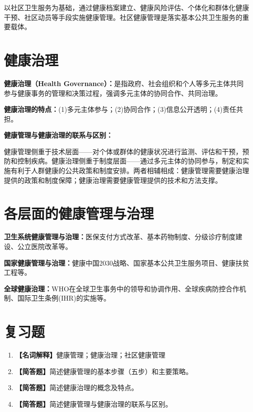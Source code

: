 \begin{defbox}
以社区卫生服务为基础，通过健康档案建立、健康风险评估、个体化和群体化健康干预、社区动员等手段实施健康管理。社区健康管理是落实基本公共卫生服务的重要载体。
\end{defbox}

\section{健康治理}

\begin{defbox}
\textbf{健康治理（Health Governance）：}是指政府、社会组织和个人等多元主体共同参与健康事务的管理和决策过程，强调多元主体的协同合作、共同治理。

\textbf{健康治理的特点：}(1)多元主体参与；(2)协同合作；(3)信息公开透明；(4)责任共担。

\textbf{健康管理与健康治理的联系与区别：}

健康管理侧重于技术层面——对个体或群体的健康状况进行监测、评估和干预，预防和控制疾病。健康治理侧重于制度层面——通过多元主体的协同参与，制定和实施有利于人群健康的公共政策和制度安排。两者相辅相成：健康管理需要健康治理提供的政策和制度保障；健康治理需要健康管理提供的技术和方法支撑。
\end{defbox}

\section{各层面的健康管理与治理}

\begin{defbox}
\textbf{卫生系统健康管理与治理：}医保支付方式改革、基本药物制度、分级诊疗制度建设、公立医院改革等。

\textbf{国家健康管理与治理：}健康中国2030战略、国家基本公共卫生服务项目、健康扶贫工程等。

\textbf{全球健康治理：}WHO在全球卫生事务中的领导和协调作用、全球疾病防控合作机制、国际卫生条例(IHR)的实施等。
\end{defbox}

\section{复习题}

\begin{enumerate}[leftmargin=*, itemsep=8pt]
    \item \textbf{【名词解释】}健康管理；健康治理；社区健康管理
    \item \textbf{【简答题】}简述健康管理的基本步骤（五步）和主要策略。
    \item \textbf{【简答题】}简述健康治理的概念及特点。
    \item \textbf{【简答题】}简述健康管理与健康治理的联系与区别。
\end{enumerate}


